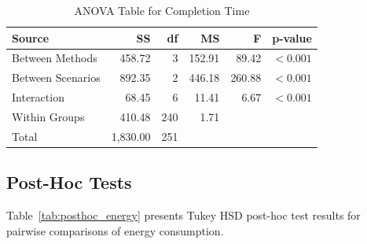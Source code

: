 \begin{table}[htbp]
\centering
\caption{ANOVA Table for Completion Time}
\label{tab:anova_time}
\begin{tabular}{@{}lrrrrr@{}}
\toprule
\textbf{Source} & \textbf{SS} & \textbf{df} & \textbf{MS} & \textbf{F} & \textbf{p-value} \\
\midrule
Between Methods & 458.72 & 3 & 152.91 & 89.42 & $< 0.001$ \\
Between Scenarios & 892.35 & 2 & 446.18 & 260.88 & $< 0.001$ \\
Interaction & 68.45 & 6 & 11.41 & 6.67 & $< 0.001$ \\
Within Groups & 410.48 & 240 & 1.71 & & \\
Total & 1,830.00 & 251 & & & \\
\bottomrule
\end{tabular}
\end{table}

\clearpage

\subsection{Post-Hoc Tests}

Table~\ref{tab:posthoc_energy} presents Tukey HSD post-hoc test results for pairwise comparisons of energy consumption.

